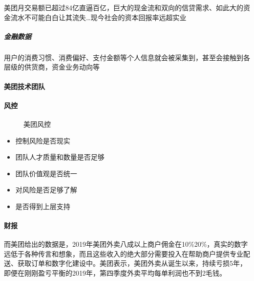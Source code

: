 \documentclass[letterpaper,10pt,english]{sphinxmanual}
\begin{document}
美团月交易额已超过84亿直逼百亿，巨大的现金流和双向的信贷需求、如此大的资金流水不可能白白让其流失…现今社会的资本回报率远超实业%
\begin{footnote}[1047]\sphinxAtStartFootnote
{}
%
\end{footnote}


\subparagraph{金融数据}
\label{\detokenize{chapter_AI_company/meituan:id16}}
用户的消费习惯、消费偏好、支付金额等个人信息就会被采集到，甚至会接触到各层级的供货商，资金业务动向等%
\begin{footnote}[1048]\sphinxAtStartFootnote
{}
%
\end{footnote}


\paragraph{美团技术团队}
\label{\detokenize{chapter_AI_company/meituan:id17}}


\paragraph{风控}
\label{\detokenize{chapter_AI_company/meituan:id18}}
\begin{figure}[H]
\centering
\capstart

\noindent{}
\caption{美团风控}\label{\detokenize{chapter_AI_company/meituan:id28}}\label{\detokenize{chapter_AI_company/meituan:id19}}\end{figure}
\begin{itemize}
\item {} 
控制风险是否现实

\item {} 
团队人才质量和数量是否足够

\item {} 
团队价值观是否统一

\item {} 
对风险是否足够了解

\item {} 
是否得到上层支持

\end{itemize}


\paragraph{财报}
\label{\detokenize{chapter_AI_company/meituan:id20}}
而美团给出的数据是，2019年美团外卖八成以上商户佣金在10\%\sphinxhyphen{}20\%，真实的数字远低于各种传言和想象，而且这些收入的绝大部分需要投入在帮助商户提供专业配送、获取订单和数字化建设中。美团表示，美团外卖从诞生以来，持续亏损5年，即便在刚刚盈亏平衡的2019年，第四季度外卖平均每单利润也不到2毛钱。
\end{document}
